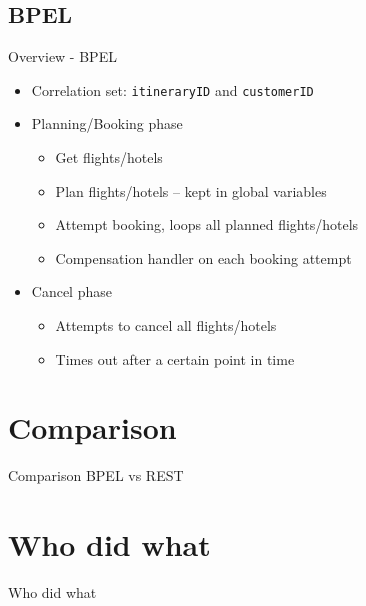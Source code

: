 \subsection{BPEL}
\begin{frame}{Overview - BPEL}
\begin{itemize}[<+->]
	\item Correlation set: \texttt{itineraryID} and \texttt{customerID}

	\medskip\item Planning/Booking phase
	\begin{itemize}
		\item Get flights/hotels
		\item<3-> Plan flights/hotels -- kept in global variables
		\item Attempt booking, loops all planned flights/hotels
		\item Compensation handler on each booking attempt
	\end{itemize}

	\medskip\item Cancel phase
	\begin{itemize}
		\item Attempts to cancel all flights/hotels
		\item<7-> Times out after a certain point in time
	\end{itemize}
\end{itemize}
\end{frame}



\section{Comparison}
\begin{frame}{Comparison BPEL vs REST}

\end{frame}


\section{Who did what}
\begin{frame}{Who did what}

\end{frame}


